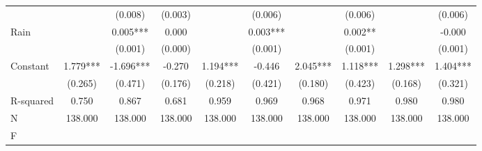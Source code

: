 {\begin{tabular}{l*{9}{c}}
                    &               &     (0.008)   &     (0.003)   &               &     (0.006)   &               &     (0.006)   &               &     (0.006)   \\
Rain                &               &       0.005***&       0.000   &               &       0.003***&               &       0.002** &               &      -0.000   \\
                    &               &     (0.001)   &     (0.000)   &               &     (0.001)   &               &     (0.001)   &               &     (0.001)   \\
Constant            &       1.779***&      -1.696***&      -0.270   &       1.194***&      -0.446   &       2.045***&       1.118***&       1.298***&       1.404***\\
                    &     (0.265)   &     (0.471)   &     (0.176)   &     (0.218)   &     (0.421)   &     (0.180)   &     (0.423)   &     (0.168)   &     (0.321)   \\
\hline
R-squared           &       0.750   &       0.867   &       0.681   &       0.959   &       0.969   &       0.968   &       0.971   &       0.980   &       0.980   \\
N                   &     138.000   &     138.000   &     138.000   &     138.000   &     138.000   &     138.000   &     138.000   &     138.000   &     138.000   \\
F                   &               &               &               &               &               &               &               &               &               \\
\hline\hline
\end{tabular}
}
